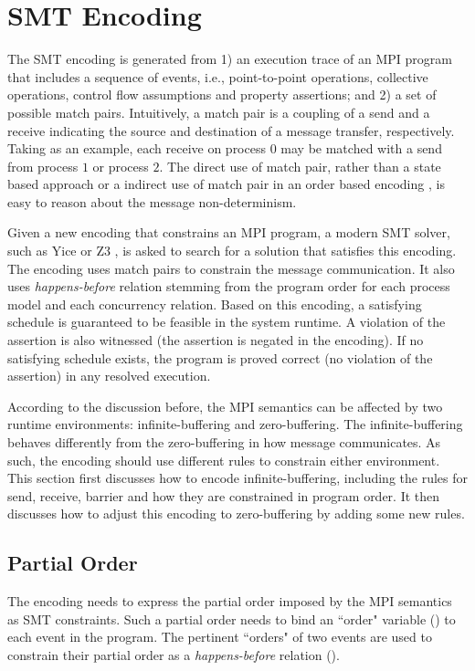 \section{SMT Encoding}
The SMT encoding is generated from 1) an execution trace of an MPI program that includes a sequence of events, i.e., point-to-point operations, collective operations, control flow assumptions and property assertions; and 2) a set of possible match pairs. Intuitively, a match pair is a coupling of a send and a receive indicating the source and destination of a message transfer, respectively. Taking  as an example, each receive on process $0$ may be matched with a send from process $1$ or process $2$. The direct use of match pair, rather than a state based approach \cite{elwakil:padtad10} or a indirect use of match pair in an order based encoding \cite{elwakil:atva10}, is easy to reason about the message non-determinism. 

Given a new encoding that constrains an MPI program, a modern SMT solver, such as Yice \cite{dutertre:CAV06} or Z3 \cite{demoura:tacas08}, is asked to search for a solution that satisfies this encoding. The encoding uses match pairs to constrain the message communication. It also uses \textit{happens-before} relation stemming from the program order for each process model and each concurrency relation. Based on this encoding, a satisfying schedule is guaranteed to be feasible in the system runtime. A violation of the assertion is also witnessed (the assertion is negated in the encoding). If no satisfying schedule exists, the program is proved correct (no violation of the assertion) in any resolved execution. 

According to the discussion before, the MPI semantics can be affected by two runtime environments: infinite-buffering and zero-buffering. The infinite-buffering behaves differently from the zero-buffering in how message communicates. As such, the encoding should use different rules to constrain either environment. This section first discusses how to encode infinite-buffering, including the rules for send, receive, barrier and how they are constrained in program order. It then discusses how to adjust this encoding to zero-buffering by adding some new rules.

\subsection{Partial Order}
The encoding needs to express the partial order imposed by the MPI semantics as SMT constraints. Such a partial order needs to bind an ``order" variable () to each event in the program. The pertinent ``orders" of two events are used to constrain their partial order as a \emph{happens-before} relation ().

